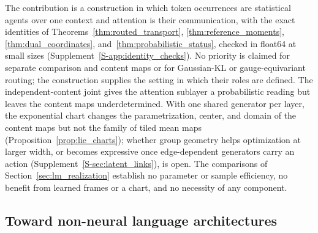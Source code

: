 \documentclass[twoside,11pt]{article}
\begin{document}
The contribution is a construction in which token occurrences are statistical agents over one context and attention is their communication, with the exact identities of Theorems~\ref{thm:routed_transport}, \ref{thm:reference_moments}, \ref{thm:dual_coordinates}, and~\ref{thm:probabilistic_status}, checked in float64 at small sizes (Supplement~\ref{S-app:identity_checks}). No priority is claimed for separate comparison and content maps or for Gaussian-KL or gauge-equivariant routing; the construction supplies the setting in which their roles are defined. The independent-content joint gives the attention sublayer a probabilistic reading but leaves the content maps underdetermined. With one shared generator per layer, the exponential chart changes the parametrization, center, and domain of the content maps but not the family of tiled mean maps (Proposition~\ref{prop:lie_charts}); whether group geometry helps optimization at larger width, or becomes expressive once edge-dependent generators carry an action (Supplement~\ref{S-sec:latent_links}), is open. The comparisons of Section~\ref{sec:lm_realization} establish no parameter or sample efficiency, no benefit from learned frames or a chart, and no necessity of any component.

\subsection{Toward non-neural language architectures}
\label{sec:nonneural}
\end{document}
